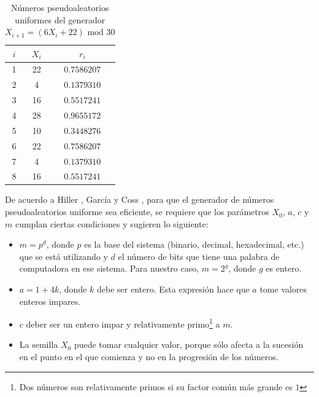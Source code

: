 \documentclass{article}
\begin{document}
\begin{table}
\centering
\caption{Números pseudoaleatorios uniformes del generador $X_ {i+1}= (6X_{i} + 22) \text{ mod } 30$}
\begin{tabular}{|c|c|c|}
\hline
\textbf{$i$} & \textbf{$X_{i}$} & \textbf{$r_{i}$} \\ \hline
1            & 22               & $0.7586207$      \\ \hline
2            & 4                & $0.1379310$      \\ \hline
3            & 16               & $0.5517241$      \\ \hline
4            & 28               & $0.9655172$      \\ \hline
5            & 10               & $0.3448276$      \\ \hline
6            & 22               & $0.7586207$      \\ \hline
7            & 4                & $0.1379310$      \\ \hline
8            & 16               & $0.5517241$      \\ \hline
\end{tabular}
\label{ejemplo1}
\end{table}



De acuerdo a Hiller \cite{hiller}, García \cite{promodel} y Coss \cite{coss}, para que el generador de números pseudoaleatorios uniforme sea eficiente, se requiere que los parámetros $X_{0}$, $a$, $c$ y $m$ cumplan ciertas condiciones y sugieren lo siguiente:

\begin{itemize}
    \item $m = p^d$, donde $p$ es la base del sistema (binario, decimal, hexadecimal, etc.) que se está utilizando y $d$ el número de bits que tiene una palabra de computadora en ese sistema. Para nuestro caso, $m = 2^g$, donde $g$ es entero.
    \item $a = 1+4k$, donde $k$ debe ser entero. Esta expresión hace que $a$ tome valores enteros impares.
    \item $c$ deber ser un entero impar y relativamente primo\footnote{Dos números son relativamente primos si su factor común más grande es $1$} a $m$.
    \item La semilla $X_{0}$ puede tomar cualquier valor, porque sólo afecta a la sucesión en el punto en el que comienza y no en la progresión de los números.
\end{itemize}
\end{document}
